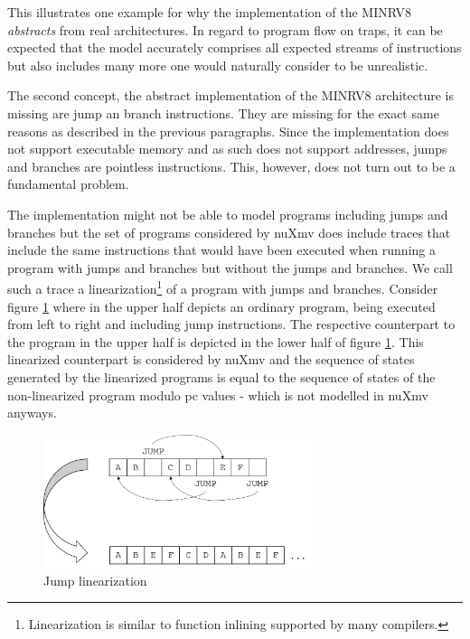 This illustrates one example for why the implementation of the MINRV8 \textit{abstracts} from real architectures.
In regard to program flow on traps, it can be expected that the model accurately comprises all expected streams of instructions but also includes many more one would naturally consider to be unrealistic.

The second concept, the abstract implementation of the MINRV8 architecture is missing are jump an branch instructions.
They are missing for the exact same reasons as described in the previous paragraphs.
Since the implementation does not support executable memory and as such does not support addresses, jumps and branches are pointless instructions.
This, however, does not turn out to be a fundamental problem.

The implementation might not be able to model programs including jumps and branches but the set of programs considered by nuXmv does include traces that include the same instructions that would have been executed when running a program with jumps and branches but without the jumps and branches.
We call such a trace a linearization\footnote{%
    Linearization is similar to function inlining supported by many compilers.
} of a program with jumps and branches.
Consider figure \ref{fig:jump-inlining} where in the upper half depicts an ordinary program, being executed from left to right and including jump instructions.
The respective counterpart to the program in the upper half is depicted in the lower half of figure \ref{fig:jump-inlining}.
This linearized counterpart is considered by nuXmv and the sequence of states generated by the linearized programs is equal to the sequence of states of the non-linearized program modulo \gls{pc} values - which is not modelled in nuXmv anyways.

\begin{figure}
    \centering
    \includegraphics[width=0.7\textwidth]{figures/jump-free-programs.png}
    \caption{Jump linearization}
    \label{fig:jump-inlining}
\end{figure}

